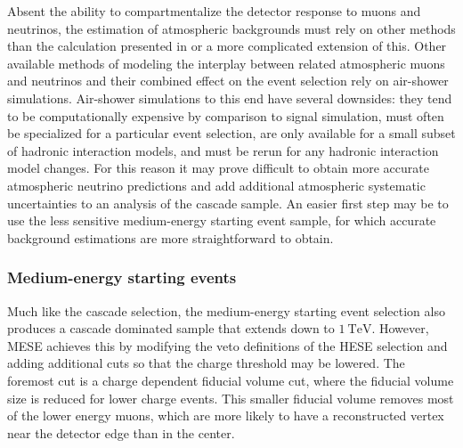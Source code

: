 Absent the ability to compartmentalize the detector response to muons and neutrinos, the estimation of atmospheric backgrounds must rely on other methods than the calculation presented in  or a more complicated extension of this.
Other available methods of modeling the interplay between related atmospheric muons and neutrinos and their combined effect on the event selection rely on air-shower simulations.
Air-shower simulations to this end have several downsides: they tend to be computationally expensive by comparison to signal simulation, must often be specialized for a particular event selection, are only available for a small subset of hadronic interaction models, and must be rerun for any hadronic interaction model changes.
For this reason it may prove difficult to obtain more accurate atmospheric neutrino predictions and add additional atmospheric systematic uncertainties to an analysis of the cascade sample.
An easier first step may be to use the less sensitive medium-energy starting event sample, for which accurate background estimations are more straightforward to obtain.

\subsubsection{Medium-energy starting events}
Much like the cascade selection, the medium-energy starting event selection also produces a cascade dominated sample that extends down to $\SI{1}\TeV$.
However, MESE achieves this by modifying the veto definitions of the HESE selection and adding additional cuts so that the charge threshold may be lowered.
The foremost cut is a charge dependent fiducial volume cut, where the fiducial volume size is reduced for lower charge events.
This smaller fiducial volume removes most of the lower energy muons, which are more likely to have a reconstructed vertex near the detector edge than in the center.

